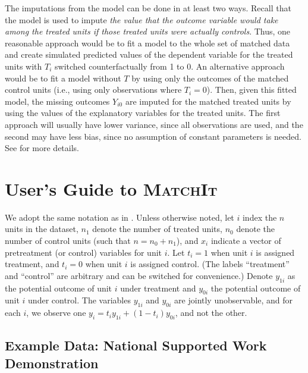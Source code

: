 \documentclass[oneside,letterpaper,titlepage]{article}
\newcommand{\MatchIt}{\textsc{MatchIt}}
\begin{document}
The imputations from the model can be done in at least two ways.
Recall that the model is used to impute \emph{the value that the
  outcome variable would take among the treated units if those treated
  units were actually controls}.  Thus, one reasonable approach would
be to fit a model to the whole set of matched data and create
simulated predicted values of the dependent variable for the treated
units with $T_i$ switched counterfactually from 1 to 0.  An
alternative approach would be to fit a model without $T$ by using only
the outcomes of the matched control units (i.e., using only
observations where $T_i=0$).  Then, given this fitted model, the
missing outcomes $Y_{i0}$ are imputed for the matched treated units by
using the values of the explanatory variables for the treated units.
The first approach will usually have lower variance, since all
observations are used, and the second may have less bias, since no
assumption of constant parameters is needed.  See \citep{HoImaKin05}
for more details.


\section{User's Guide to \MatchIt}
\label{methods}

We adopt the same notation as in \citet*{HoImaKin05}. Unless otherwise
noted, let $i$ index the $n$ units in the dataset, $n_1$ denote the
number of treated units, $n_0$ denote the number of control units
(such that $n=n_0+n_1$), and $x_i$ indicate a vector of pretreatment
(or control) variables for unit $i$.  Let $t_i=1$ when unit $i$ is
assigned treatment, and $t_i=0$ when unit $i$ is assigned control.
(The labels ``treatment'' and ``control'' are arbitrary and can be
switched for convenience.)  Denote $y_{1i}$ as the potential outcome
of unit $i$ under treatment and $y_{0i}$ the potential outcome of unit
$i$ under control.  The variables $y_{1i}$ and $y_{0i}$ are jointly
unobservable, and for each $i$, we observe one
$y_i=t_iy_{1i}+(1-t_i)y_{0i}$, and not the other.


\subsection{Example Data: National Supported Work Demonstration}
\label{subsec:lalonde}
\end{document}
